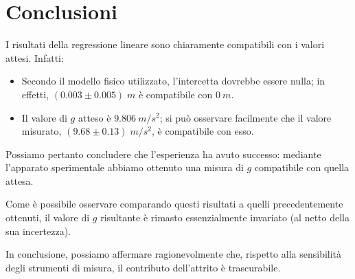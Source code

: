\documentclass{article}
\begin{document}
\section{Conclusioni}


\pagebreak
I risultati della regressione lineare sono chiaramente compatibili
con i valori attesi. Infatti:
\begin{itemize}
  \item Secondo il modello fisico utilizzato, l'intercetta dovrebbe
  essere nulla; in effetti, $(0.003\pm0.005)\;\unit{m}$ è compatibile
  con $\qty{0}{m}$.
  \item Il valore di $g$ atteso è $\qty{9.806}{m\per s^2}$; si può
  osservare facilmente che il valore misurato,
  $(9.68\pm0.13)\;\unit{m \per s^2}$, è compatibile con esso.
\end{itemize}

Possiamo pertanto concludere che l'esperienza ha avuto successo:
mediante l'apparato sperimentale abbiamo ottenuto una misura di $g$
compatibile con quella attesa.

Come è possibile osservare comparando questi risultati a
quelli precedentemente ottenuti, il valore di $g$ risultante
è rimasto essenzialmente invariato (al netto della sua incertezza).

In conclusione, possiamo affermare ragionevolmente che,
rispetto alla sensibilità degli strumenti di misura,
il contributo dell'attrito è trascurabile.
\end{document}
